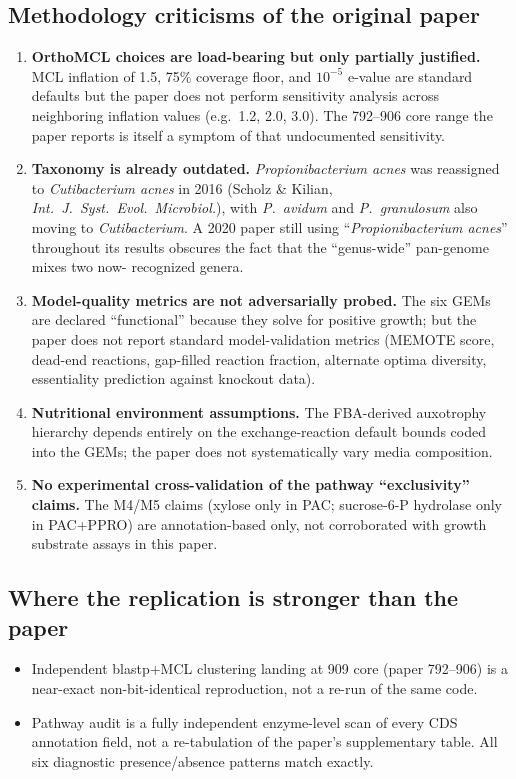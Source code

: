 \documentclass[11pt]{article}
\begin{document}
\subsection{Methodology criticisms of the original paper}
\begin{enumerate}
\item \textbf{OrthoMCL choices are load-bearing but only partially justified.}
      MCL inflation of 1.5, 75\% coverage floor, and $10^{-5}$ e-value are
      standard defaults but the paper does not perform sensitivity analysis
      across neighboring inflation values (e.g.\ 1.2, 2.0, 3.0). The 792--906
      core range the paper reports is itself a symptom of that undocumented
      sensitivity.
\item \textbf{Taxonomy is already outdated.} \emph{Propionibacterium acnes} was
      reassigned to \emph{Cutibacterium acnes} in 2016 (Scholz \& Kilian,
      \emph{Int.\ J.\ Syst.\ Evol.\ Microbiol.}), with \emph{P.\ avidum} and
      \emph{P.\ granulosum} also moving to \emph{Cutibacterium}. A 2020 paper
      still using ``\emph{Propionibacterium acnes}'' throughout its results
      obscures the fact that the ``genus-wide'' pan-genome mixes two now-
      recognized genera.
\item \textbf{Model-quality metrics are not adversarially probed.} The six GEMs
      are declared ``functional'' because they solve for positive growth; but
      the paper does not report standard model-validation metrics (MEMOTE
      score, dead-end reactions, gap-filled reaction fraction, alternate optima
      diversity, essentiality prediction against knockout data).
\item \textbf{Nutritional environment assumptions.} The FBA-derived auxotrophy
      hierarchy depends entirely on the exchange-reaction default bounds coded
      into the GEMs; the paper does not systematically vary media composition.
\item \textbf{No experimental cross-validation of the pathway ``exclusivity''
      claims.} The M4/M5 claims (xylose only in PAC; sucrose-6-P hydrolase only
      in PAC+PPRO) are annotation-based only, not corroborated with growth
      substrate assays in this paper.
\end{enumerate}

\subsection{Where the replication is stronger than the paper}
\begin{itemize}
\item Independent blastp+MCL clustering landing at 909 core (paper 792--906)
      is a near-exact non-bit-identical reproduction, not a re-run of the same
      code.
\item Pathway audit is a fully independent enzyme-level scan of every CDS
      annotation field, not a re-tabulation of the paper's supplementary table.
      All six diagnostic presence/absence patterns match exactly.
\end{itemize}
\end{document}
